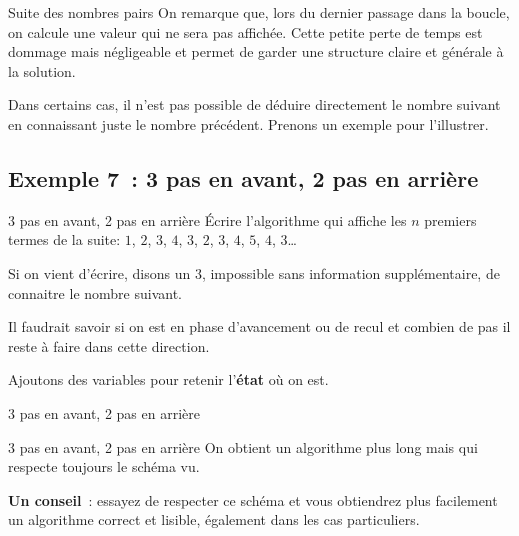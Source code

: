 \begin{frame}{Suite des nombres pairs}
	On remarque que, lors du dernier passage dans la boucle,
	on calcule une valeur qui ne sera pas affichée.
	Cette petite perte de temps est dommage mais négligeable
	et permet de garder une structure claire et générale à la solution.

	\bigskip
	
	Dans certains cas,
	il n'est pas possible de déduire directement le nombre suivant
	en connaissant juste le nombre précédent.
	Prenons un exemple pour l'illustrer.
\end{frame}

\subsection{Exemple 7~: 3 pas en avant, 2 pas en arrière} 

\begin{frame}{3 pas en avant, 2 pas en arrière} 
	Écrire l'algorithme qui affiche les $n$ premiers termes
	de la suite: $1$, $2$, $3$, $4$, $3$, $2$, $3$, $4$, $5$, $4$, $3$\dots

	\bigskip
	
	Si on vient d'écrire, disons un $3$,
	impossible sans information supplémentaire,
	de connaitre le nombre suivant.
	
	\bigskip
	
	Il faudrait savoir si on est en phase d'avancement ou de recul
	et combien de pas il reste à faire dans cette direction.

	\bigskip
	
	Ajoutons des variables pour retenir l'\textbf{état} où on est.
\end{frame}

\begin{frame}{3 pas en avant, 2 pas en arrière} 
\end{frame}

\begin{frame}{3 pas en avant, 2 pas en arrière} 
	On obtient un algorithme plus long 
	mais qui respecte toujours le schéma vu.

	\bigskip
	
	\textbf{Un conseil}~: essayez de respecter ce schéma 
	et vous obtiendrez plus facilement un algorithme
	correct et lisible, également dans les cas particuliers.
\end{frame}
